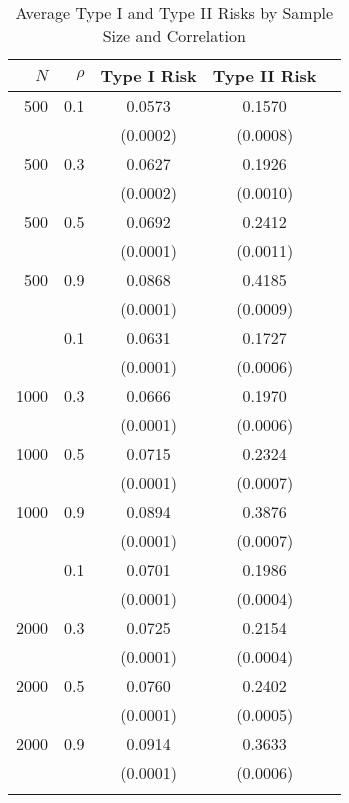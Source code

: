 \begin{table}
\caption{Average Type I and Type II Risks by Sample Size and Correlation}
\centering
\begin{tabular}{rrccc}
\toprule
$N$ & $\rho$ & \multicolumn{1}{c}{Type I Risk} & \multicolumn{1}{c}{Type II Risk} \\
\midrule
500 & 0.1 & 0.0573 & 0.1570 \\
& & (0.0002) & (0.0008) \\
500 & 0.3 & 0.0627 & 0.1926 \\
& & (0.0002) & (0.0010) \\
500 & 0.5 & 0.0692 & 0.2412 \\
& & (0.0001) & (0.0011) \\
500 & 0.9 & 0.0868 & 0.4185 \\
& & (0.0001) & (0.0009) \\
\addlinespace
1000 & 0.1 & 0.0631 & 0.1727 \\
& & (0.0001) & (0.0006) \\
1000 & 0.3 & 0.0666 & 0.1970 \\
& & (0.0001) & (0.0006) \\
1000 & 0.5 & 0.0715 & 0.2324 \\
& & (0.0001) & (0.0007) \\
1000 & 0.9 & 0.0894 & 0.3876 \\
& & (0.0001) & (0.0007) \\
\addlinespace
2000 & 0.1 & 0.0701 & 0.1986 \\
& & (0.0001) & (0.0004) \\
2000 & 0.3 & 0.0725 & 0.2154 \\
& & (0.0001) & (0.0004) \\
2000 & 0.5 & 0.0760 & 0.2402 \\
& & (0.0001) & (0.0005) \\
2000 & 0.9 & 0.0914 & 0.3633 \\
& & (0.0001) & (0.0006) \\
\addlinespace
\bottomrule
\end{tabular}
\end{table}
